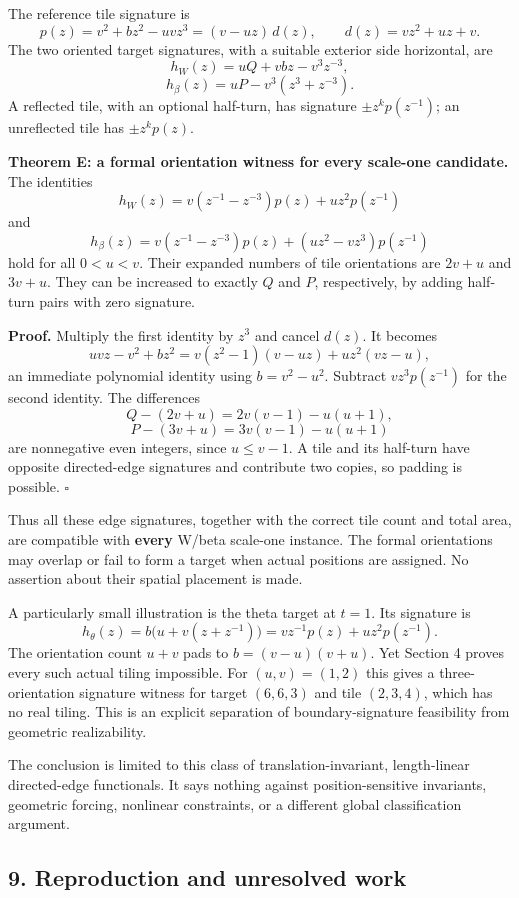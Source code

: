\documentclass[
  11pt,
]{article}
\begin{document}
The reference tile signature is
\[p(z)=v^2+bz^2-uvz^3=(v-uz)\,d(z),\qquad d(z)=vz^2+uz+v.\] The two
oriented target signatures, with a suitable exterior side horizontal,
are \[h_W(z)=uQ+vbz-v^3z^{-3},\] \[h_\beta(z)=uP-v^3(z^3+z^{-3}).\] A
reflected tile, with an optional half-turn, has signature
\(\pm z^k p(z^{-1})\); an unreflected tile has \(\pm z^k p(z)\).

\textbf{Theorem E: a formal orientation witness for every scale-one
candidate.} The identities
\[\boxed{h_W(z)=v(z^{-1}-z^{-3})p(z)+uz^2p(z^{-1})}\] and
\[\boxed{h_\beta(z)=v(z^{-1}-z^{-3})p(z)
 +(uz^2-vz^3)p(z^{-1})}\] hold for all \(0<u<v\). Their expanded numbers
of tile orientations are \(2v+u\) and \(3v+u\). They can be increased to
exactly \(Q\) and \(P\), respectively, by adding half-turn pairs with
zero signature.

\textbf{Proof.} Multiply the first identity by \(z^3\) and cancel
\(d(z)\). It becomes \[uvz-v^2+bz^2=v(z^2-1)(v-uz)+uz^2(vz-u),\] an
immediate polynomial identity using \(b=v^2-u^2\). Subtract
\(vz^3p(z^{-1})\) for the second identity. The differences
\[Q-(2v+u)=2v(v-1)-u(u+1),\] \[P-(3v+u)=3v(v-1)-u(u+1)\] are nonnegative
even integers, since \(u\le v-1\). A tile and its half-turn have
opposite directed-edge signatures and contribute two copies, so padding
is possible. \(\square\)

Thus all these edge signatures, together with the correct tile count and
total area, are compatible with \textbf{every} W/beta scale-one
instance. The formal orientations may overlap or fail to form a target
when actual positions are assigned. No assertion about their spatial
placement is made.

A particularly small illustration is the theta target at \(t=1\). Its
signature is \[h_\theta(z)=b\bigl(u+v(z+z^{-1})\bigr)
 =vz^{-1}p(z)+uz^2p(z^{-1}).\] The orientation count \(u+v\) pads to
\(b=(v-u)(v+u)\). Yet Section 4 proves every such actual tiling
impossible. For \((u,v)=(1,2)\) this gives a three-orientation signature
witness for target \((6,6,3)\) and tile \((2,3,4)\), which has no real
tiling. This is an explicit separation of boundary-signature feasibility
from geometric realizability.

The conclusion is limited to this class of translation-invariant,
length-linear directed-edge functionals. It says nothing against
position-sensitive invariants, geometric forcing, nonlinear constraints,
or a different global classification argument.

\subsection{9. Reproduction and unresolved
work}\label{reproduction-and-unresolved-work}
\end{document}

